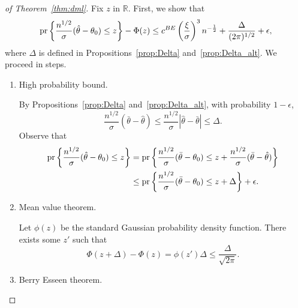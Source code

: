 \begin{proof}[of Theorem~\ref{thm:dml}]
Fix $z$ in $\mathbb{R}$. First, we show that
$$
\text{\normalfont pr}\left\{\frac{n^{1/2}}{\sigma}(\hat{\theta}-\theta_0)\leq z\right\}-\Phi(z)\leq c^{BE} \left(\frac{\xi}{\sigma}\right)^3n^{-\frac{1}{2}} +\frac{\Delta}{(2\pi)^{1/2}}+\epsilon,
$$
where $\Delta$ is defined in Propositions~\ref{prop:Delta} and~\ref{prop:Delta_alt}. We proceed in steps.
\begin{enumerate}
    \item High probability bound. 
    
    By Propositions~\ref{prop:Delta} and~\ref{prop:Delta_alt}, with probability $1-\epsilon$, 
$$
\frac{n^{1/2}}{\sigma}(\bar{\theta}-\hat{\theta}) \leq \frac{n^{1/2}}{\sigma}|\hat{\theta}-\bar{\theta}|\leq \Delta.
$$
Observe that
\begin{align*}
    \text{\normalfont pr}\left\{\frac{n^{1/2}}{\sigma}(\hat{\theta}-\theta_0)\leq z\right\}
    &=\text{\normalfont pr}\left\{\frac{n^{1/2}}{\sigma}(\bar{\theta}-\theta_0)\leq z+\frac{n^{1/2}}{\sigma}(\bar{\theta}-\hat{\theta})\right\}\\
    &\leq \text{\normalfont pr}\left\{\frac{n^{1/2}}{\sigma}(\bar{\theta}-\theta_0)\leq z+\Delta\right\}+\epsilon.
\end{align*}
    \item Mean value theorem.
    
    Let $\phi(z)$ be the standard Gaussian probability density function. There exists some $z'$ such that
    $$
\Phi(z+\Delta)-\Phi(z) =\phi(z') \Delta \leq \frac{\Delta}{\sqrt{2 \pi}}.
$$
    \item Berry Esseen theorem.
    

\end{enumerate}
\end{proof}
